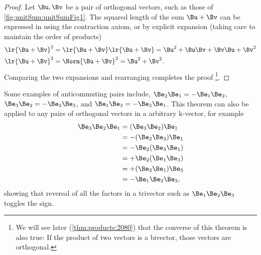 %
%

\begin{proof}
Let \( \Bu, \Bv \) be a pair of orthogonal vectors, such as those of
\cref{fig:unitSum:unitSumFig1}.  The squared length of the sum \( \Bu + \Bv \) can be expressed in using
the contraction axiom, or by explicit expansion (taking care to maintain the order of products)
\begin{align*}
\lr{ \Bu + \Bv }^2 &= \lr{ \Bu + \Bv }\lr{ \Bu + \Bv } = \Bu^2 + \Bu \Bv + \Bv \Bu + \Bv^2 \\
\lr{ \Bu + \Bv }^2 &= \Norm{ \Bu + \Bv }^2 = \Bu^2 + \Bv^2.
\end{align*}
Comparing the two expansions and rearranging completes the proof%
\footnote{We will see later (\cref{thm:products:2080}) that the converse of this theorem is also true: If the product of two vectors is a bivector, those vectors are orthogonal.}.
\end{proof}
%

Some examples of anticommuting pairs include,
\( \Be_2 \Be_1 = -\Be_1 \Be_2 \),
\( \Be_3 \Be_2 = -\Be_2 \Be_3 \), and
\( \Be_1 \Be_3 = -\Be_3 \Be_1 \).  This theorem can also be applied to any pairs of orthogonal vectors in a arbitrary k-vector, for example
\begin{equation}\label{eqn:normalVectors:300}
\begin{aligned}
\Be_3 \Be_2 \Be_1
&= (\Be_3 \Be_2) \Be_1 \\
&= -(\Be_2 \Be_3) \Be_1 \\
&= -\Be_2 (\Be_3 \Be_1) \\
&= +\Be_2 (\Be_1 \Be_3) \\
&= +(\Be_2 \Be_1) \Be_3 \\
&= -\Be_1 \Be_2 \Be_3,
\end{aligned}
\end{equation}
showing that reversal of all the factors in a trivector such as \( \Be_1 \Be_2 \Be_3 \) toggles the sign.

